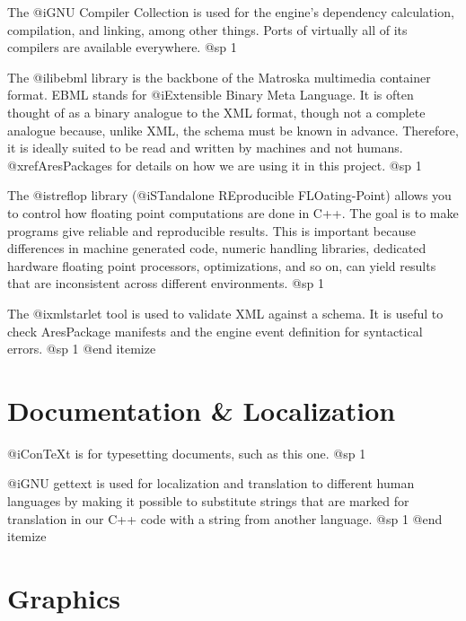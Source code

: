 \item
The @i{GNU Compiler Collection} is used for the engine's dependency calculation, compilation, and linking, among other things. Ports of virtually all of its compilers are available everywhere.
@sp 1

\item
The @i{libebml} library is the backbone of the Matroska multimedia container format. EBML stands for @i{Extensible Binary Meta Language}. It is often thought of as a binary analogue to the XML format, though not a complete analogue because, unlike XML, the schema must be known in advance. Therefore, it is ideally suited to be read and written by machines and not humans. @xref{AresPackages} for details on how we are using it in this project.
@sp 1

\item
The @i{streflop} library (@i{STandalone REproducible FLOating-Point}) allows you to control how floating point computations are done in C++. The goal is to make programs give reliable and reproducible results. This is important because differences in machine generated code, numeric handling libraries, dedicated hardware floating point processors, optimizations, and so on, can yield results that are inconsistent across different environments.
@sp 1

\item
The @i{xmlstarlet} tool is used to validate XML against a schema. It is useful to check AresPackage manifests and the engine event definition for syntactical errors.
@sp 1
@end itemize


\section{Documentation & Localization}

\itemize
\item
@i{ConTeXt} is for typesetting documents, such as this one.
@sp 1

\item
@i{GNU gettext} is used for localization and translation to different human languages by making it possible to substitute strings that are marked for translation in our C++ code with a string from another language.
@sp 1
@end itemize

\section{Graphics}

